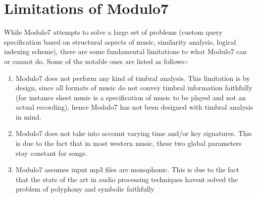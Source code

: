 \section{Limitations of Modulo7}

While Modulo7 attempts to solve a large set of problems (custom query specification based on structural aspects of music, similarity analysis, logical indexing scheme), there are some fundamental limitations to what Modulo7 can or cannot do. Some of the notable ones are listed as follows:-

\begin{enumerate}
\item Modulo7 does not perform any kind of timbral analysis. This limitation is by design, since all formats of music do not convey timbral information faithfully (for instance sheet music is a specification of music to be played and not an actual recording), hence Modulo7 has not been designed with timbral analysis in mind.
\item Modulo7 does not take into account varying time and/or key signatures. This is due to the fact that in most western music, these two global parameters stay constant for songs.
\item Modulo7 assumes input mp3 files are monophonic. This is due to the fact that the state of the art in audio processing techniques havent solved the problem of polyphony and symbolic faithfully  \cite{melextract}
\end{enumerate}
